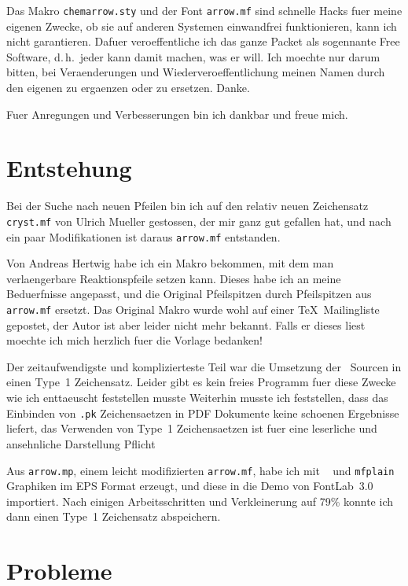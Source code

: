 \documentclass[german, DIV=9, pagesize=auto]{scrartcl}
\begin{document}
Das Makro \texttt{chemarrow.sty} und der Font \texttt{arrow.mf} sind schnelle Hacks fuer 
meine eigenen Zwecke, ob sie auf anderen Systemen einwandfrei funktionieren, 
kann ich nicht garantieren. Dafuer veroeffentliche ich das ganze Packet als 
sogennante Free Software, d.\,h.\ jeder kann damit machen, was er will. Ich 
moechte nur darum bitten, bei Veraenderungen und Wiederveroeffentlichung 
meinen Namen durch den eigenen zu ergaenzen oder zu ersetzen. Danke.

Fuer Anregungen und Verbesserungen bin ich dankbar und freue mich.


\section{Entstehung}

Bei der Suche nach neuen Pfeilen bin ich auf den relativ neuen Zeichensatz 
\texttt{cryst.mf} von Ulrich Mueller gestossen, der mir ganz gut gefallen hat, und nach 
ein paar Modifikationen ist daraus \texttt{arrow.mf} entstanden.

Von Andreas Hertwig habe ich ein Makro bekommen, mit dem man verlaengerbare 
Reaktionspfeile setzen kann. Dieses habe ich an meine Beduerfnisse angepasst, 
und die Original Pfeilspitzen durch Pfeilspitzen aus \texttt{arrow.mf} ersetzt. Das 
Original Makro wurde wohl auf einer \TeX\ Mailingliste gepostet, der Autor 
ist aber leider nicht mehr bekannt. Falls er dieses liest moechte ich mich 
herzlich fuer die Vorlage bedanken!

Der zeitaufwendigste und komplizierteste Teil war die Umsetzung der 
\MF\ Sourcen in einen Type~1 Zeichensatz. Leider gibt es kein freies 
Programm fuer diese Zwecke wie ich enttaeuscht feststellen musste \frownie
Weiterhin musste ich feststellen, dass das Einbinden von \texttt{.pk} Zeichensaetzen in 
PDF Dokumente keine schoenen Ergebnisse liefert, das Verwenden von Type~1 
Zeichensaetzen ist fuer eine leserliche und ansehnliche Darstellung 
Pflicht \frownie

Aus \texttt{arrow.mp}, einem leicht modifizierten \texttt{arrow.mf}, habe ich mit \MP\ %
und \texttt{mfplain} Graphiken im EPS Format erzeugt, und diese in die Demo 
von FontLab~3.0 importiert. Nach einigen Arbeitsschritten und 
Verkleinerung auf 79\% konnte ich dann einen Type~1 Zeichensatz abspeichern.


\section{Probleme}
\end{document}

